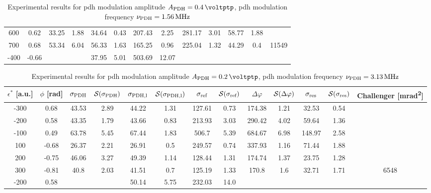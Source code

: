 \begin{landscape}
\begin{table}
\begin{tabular}{|c|c|c|c|c|c|c|c|c|c|c|c|c|}
		600 & 0.62 & 33.25 & 1.88 & 34.64 & 0.43 & 207.43 & 2.25 & 281.17 & 3.01 & 58.77 & 1.88 & \\
		700 & 0.68 & 53.34 & 6.04 & 56.33 & 1.63 & 165.25 & 0.96 & 225.04 & 1.32 & 44.29 & 0.4 & 11549\\
		\hline
		\hline
		-400 & -0.66 & & & 37.95 & 5.01 & 503.69 & 12.07 & & & & & \\
		\hline
	\end{tabular}
	\caption{Experimental results for \gls{pdh} modulation amplitude $\tind{A}{PDH} = \SI{0.4}{\voltptp}$, \gls{pdh} modulation frequency $\nu_{\text{PDH}} = \SI{1.56}{\mega\hertz}$}
	\end{table}
	
	
	\begin{table}
	\centering
	\begin{tabular}{|c|c|c|c|c|c|c|c|c|c|c|c|c|}
		\hline
		$\epsilon^*$ [a.u.] & $\phi$ [\si{\radian}] & $\sigma_{\text{PDH}}$ & $\mathcal{S}(\sigma_{\text{PDH}})$ & $\sigma_{\text{PDH,l}}$ & $\mathcal{S}(\sigma_{\text{PDH,l}})$  & $\sigma_{\text{ref}}$ & $\mathcal{S}(\sigma_{\text{ref}})$ & $\Delta \varphi$ & $\mathcal{S}(\Delta \varphi)$ & $\sigma_{\text{res}}$  & $\mathcal{S}(\sigma_{\text{res}})$ & Challenger [\si{\milli\radian\squared}] \\
		\hline
		\hline
		-300 & 0.68 & 43.53 & 2.89 & 44.22 & 1.31 & 127.61 & 0.73 & 174.38 & 1.21 & 32.53 & 0.54 & \\
		-200 & 0.58 & 43.35 & 1.79 & 43.66 & 0.83 & 213.93 & 3.03 & 290.42 & 4.02 & 59.64 & 1.36 & \\
		-100 & 0.49 & 63.78 & 5.45 & 67.44 & 1.83 & 506.7 & 5.39 & 684.67 & 6.98 & 148.97 & 2.58 & \\
		100 & -0.68 & 26.37 & 2.21 & 26.91 & 0.5 & 249.57 & 0.74 & 337.93 & 1.16 & 71.44 & 1.88 & \\
		200 & -0.75 & 46.06 & 3.27 & 49.39 & 1.14 & 128.44 & 1.31 & 174.74 & 1.37 & 23.75 & 1.28 & \\
		300 & -0.81 & 40.8 & 2.03 & 41.51 & 0.7 & 125.19 & 1.33 & 170.8 & 1.6 & 32.71 & 1.71 & 6548\\
		\hline
		\hline
		-200 & 0.58 & & & 50.14 & 5.75 & 232.03 & 14.0 & & & & & \\
		\hline
	\end{tabular}
	\caption{Experimental results for \gls{pdh} modulation amplitude $\tind{A}{PDH} = \SI{0.2}{\voltptp}$, \gls{pdh} modulation frequency $\nu_{\text{PDH}} = \SI{3.13}{\mega\hertz}$}
	\end{table}
	

\end{landscape}
